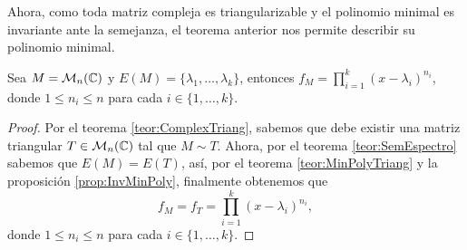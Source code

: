 Ahora, como toda matriz compleja es triangularizable y el polinomio minimal es invariante ante la semejanza, el teorema anterior nos permite describir su polinomio minimal.

\begin{coro} \label{coro:PolyMinCompelx}
  Sea $M = \mathcal{M}_n(\mathbb{C})$ y $E(M) = \{\lambda_1,\ldots,\lambda_k\}$, entonces $ f_M = \prod_{i=1}^k (x-\lambda_i)^{n_i}$, donde $1 \leq n_i \leq n$ para cada $i \in \{1,\ldots,k\}$.
\end{coro}
\begin{proof}
  Por el teorema \ref{teor:ComplexTriang}, sabemos que debe existir una matriz triangular $T \in \mathcal{M}_n(\mathbb{C})$ tal que $M \sim T$. Ahora, por el teorema \ref{teor:SemEspectro} sabemos que $E(M) = E(T)$, así, por el teorema \ref{teor:MinPolyTriang} y la proposición \ref{prop:InvMinPoly}, finalmente obtenemos que
  \[
    f_M = f_T = \prod_{i=1}^k (x-\lambda_i)^{n_i},
  \]
donde $1 \leq n_i \leq n$ para cada $i \in \{1,\ldots,k\}$.
\end{proof}